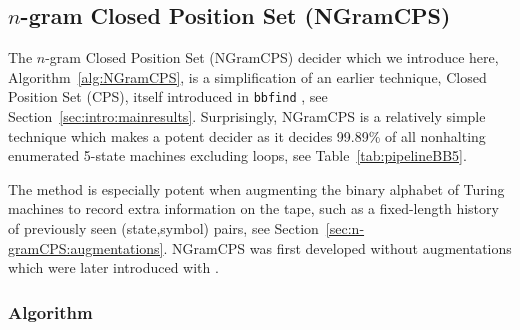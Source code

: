 
\newcommand{\ngramcps}{NGramCPS\xspace}

\subsection{$n$-gram Closed Position Set (\ngramcps)}\label{sec:n-gramCPS}

\newcommand{\leftngram}{left\xspace}
\newcommand{\rightngram}{right\xspace}
\newcommand{\middlesymbol}{middle\xspace}

The $n$-gram Closed Position Set (\ngramcps) decider which we introduce here, Algorithm~\ref{alg:NGramCPS}, is a simplification of an earlier technique, Closed Position Set (CPS), itself introduced in \texttt{bbfind} \cite{Skelet_bbfind}, see Section~\ref{sec:intro:mainresults}. Surprisingly, \ngramcps is a relatively simple technique which makes a potent decider as it decides 99.89\% of all nonhalting enumerated 5-state machines excluding loops, see Table~\ref{tab:pipelineBB5}.

The method is especially potent when augmenting the binary alphabet of Turing machines to record extra information on the tape, such as a fixed-length history of previously seen (state,symbol) pairs, see Section~\ref{sec:n-gramCPS:augmentations}. \ngramcps was first developed without augmentations \cite{ngramcps_fenner} which were later introduced with \CoqBB.

\subsubsection{Algorithm}\label{sec:n-gramCPS:algo}


